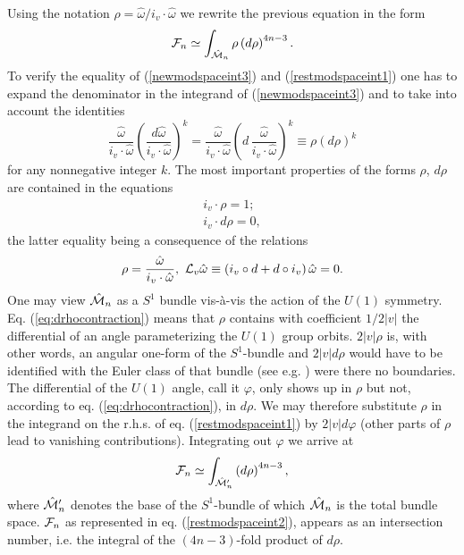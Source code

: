 \documentclass[a4paper,12pt]{article}
\begin{document}
Using the notation $\rho =\hat{\omega}/i_v \cdot \hat{\omega}$ 
we rewrite the previous equation in the form 
\begin{equation}
{\cal F}_n \simeq \int_{\hat{{\cal M}}_n} \rho \left(d\rho \right)^{4n-3}.
\label{restmodspaceint1}
\end{equation}  
To verify the equality of (\ref{newmodspaceint3}) and 
(\ref{restmodspaceint1}) one has to expand the denominator in the 
integrand of (\ref{newmodspaceint3}) and to take into account the 
identities 
\begin{equation}
\frac{\hat{\omega}}{i_v \cdot \hat{\omega}} 
\left(\frac{d\hat{\omega}}{i_v \cdot \hat{\omega}} \right)^k =
\frac{\hat{\omega}}{i_v \cdot \hat{\omega}} 
\left(d\, \frac{\hat{\omega}}{i_v \cdot \hat{\omega}} \right)^k \equiv 
\rho \left(d\rho \right)^k 
\end{equation} 
for any nonnegative integer $k$. 
The most important properties of the forms $\rho$, $d\rho$ are contained 
in the equations 
\begin{eqnarray}
\label{eq:rhocontraction}
i_v \cdot \rho =1; \\
\label{eq:drhocontraction}
i_v \cdot d\rho =0,
\end{eqnarray}
the latter equality being a consequence of the relations 
\begin{equation}
\rho=\frac{\hat{\omega}}{i_v \cdot \hat{\omega}}, \,\, 
{\cal L}_v \hat{\omega}\equiv \left(i_v \circ d + 
d \circ i_v \right) \hat{\omega}=0.
\end{equation}
One may view $\hat{{\cal M}}_n$ as a $S^1$ bundle vis-\`{a}-vis 
the action of the $U(1)$ symmetry. Eq. (\ref{eq:drhocontraction}) means 
that $\rho$ contains with coefficient $1/2|v|$ the differential of an 
angle parameterizing the $U(1)$ group orbits. $2|v|\rho$ is, with other words, 
an angular one-form of the $S^1$-bundle and $2|v|d\rho$ 
would have to be identified with the Euler class of that bundle 
(see e.g. \cite{bott}) were there 
no boundaries. The differential of the $U(1)$ angle, call it $\varphi$, 
only shows up in $\rho$ but not, according to eq. 
(\ref{eq:drhocontraction}), in $d\rho$. We may therefore substitute
$\rho$ in the integrand on the r.h.s. of eq. 
(\ref{restmodspaceint1}) by $2|v|d\varphi$ (other parts of $\rho$ lead to
vanishing contributions). Integrating out $\varphi$ we arrive at 
\begin{equation}
{\cal F}_n \simeq \int_{\hat{{\cal M}}'_n} \left(d\rho \right)^{4n-3}, 
\label{restmodspaceint2}
\end{equation}       
where $\hat{{\cal M}}'_n$ denotes the base 
of the $S^1$-bundle of which $\hat{{\cal M}}_n$ is the total bundle 
space. ${\cal F}_n$ as represented in eq. (\ref{restmodspaceint2}), 
appears as an intersection number, i.e. the integral of the 
$(4n-3)$-fold product of $d\rho$.
\end{document}
